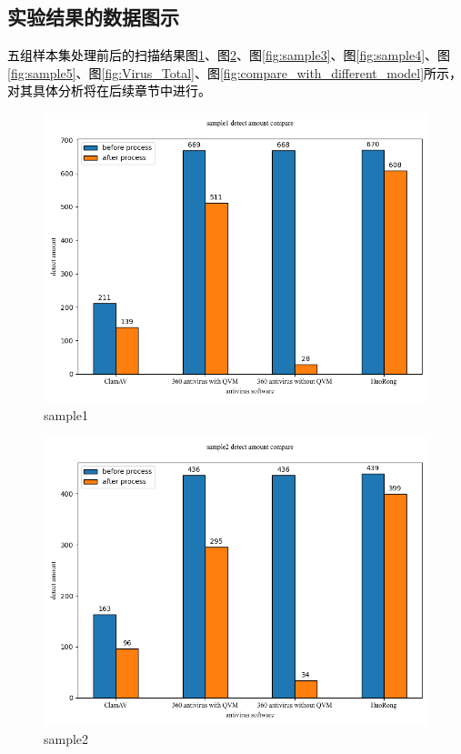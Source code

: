 \subsection{实验结果的数据图示}

\textcolor{black}{五组样本集处理前后的扫描结果图\ref{fig:sample1}、图\ref{fig:sample2}、图\ref{fig:sample3}、图\ref{fig:sample4}、图\ref{fig:sample5}、图\ref{fig:Virus_Total}、图\ref{fig:compare_with_different_model}所示，对其具体分析将在后续章节中进行。}

\begin{figure}[htbp]
  \includegraphics[scale=0.60]{images/sample1.png}
  \caption{sample1}\label{fig:sample1}
\end{figure}
\begin{figure}[htbp]
  \includegraphics[scale=0.60]{images/sample2.png}
  \caption{sample2}\label{fig:sample2}
\end{figure}
